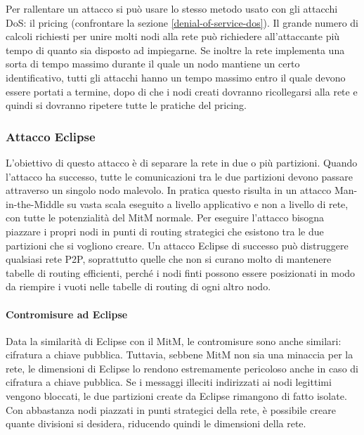 Per rallentare un attacco si può usare lo stesso metodo usato con gli attacchi DoS: il pricing (confrontare la sezione \ref{denial-of-service-dos}).
Il grande numero di calcoli richiesti per unire molti nodi alla rete può richiedere all'attaccante più tempo di quanto sia disposto ad impiegarne. Se inoltre la rete implementa una sorta di tempo massimo durante il quale un nodo mantiene un certo identificativo, tutti gli attacchi hanno un tempo massimo entro il quale devono essere portati a termine, dopo di che i nodi creati dovranno ricollegarsi alla rete e quindi si dovranno ripetere tutte le pratiche del pricing.

\subsubsection{Attacco Eclipse}\label{attacco-eclipse}

L'obiettivo di questo attacco è di separare la rete in due o più partizioni. Quando l'attacco ha successo, tutte le comunicazioni tra le due partizioni devono passare attraverso un singolo nodo malevolo. In pratica questo risulta in un attacco Man-in-the-Middle su vasta scala eseguito a livello applicativo e non a livello di rete, con tutte le potenzialità del MitM normale. Per eseguire l'attacco bisogna piazzare i propri nodi in punti di routing strategici che esistono tra le due partizioni che si vogliono creare. Un attacco Eclipse di successo può distruggere qualsiasi rete P2P, soprattutto quelle che non si curano molto di mantenere tabelle di routing efficienti, perché i nodi finti possono essere posizionati in modo da riempire i vuoti nelle tabelle di routing di ogni altro nodo.

\paragraph{Contromisure ad Eclipse}\label{contromisure-ad-eclipse}

Data la similarità di Eclipse con il MitM, le contromisure sono anche similari: cifratura a chiave pubblica. Tuttavia, sebbene MitM non sia una minaccia per la rete, le dimensioni di Eclipse lo rendono estremamente pericoloso anche in caso di cifratura a chiave pubblica. Se i messaggi illeciti indirizzati ai nodi legittimi vengono bloccati, le due partizioni create da Eclipse rimangono di fatto isolate. Con abbastanza nodi piazzati in punti strategici della rete, è possibile creare quante divisioni si desidera, riducendo quindi le dimensioni della rete.

